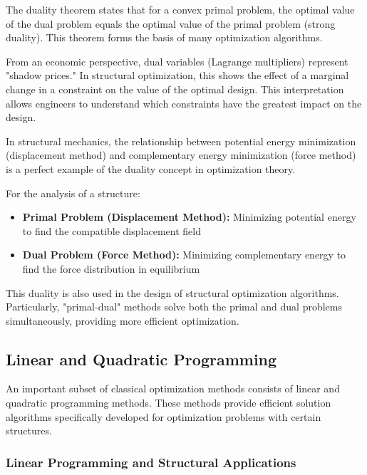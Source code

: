 The duality theorem states that for a convex primal problem, the optimal value of the dual problem equals the optimal value of the primal problem (strong duality). This theorem forms the basis of many optimization algorithms.

From an economic perspective, dual variables (Lagrange multipliers) represent "shadow prices." In structural optimization, this shows the effect of a marginal change in a constraint on the value of the optimal design. This interpretation allows engineers to understand which constraints have the greatest impact on the design.

\begin{tcolorbox}[title=Relationship Between Duality and Structural Analysis]
In structural mechanics, the relationship between potential energy minimization (displacement method) and complementary energy minimization (force method) is a perfect example of the duality concept in optimization theory.

For the analysis of a structure:
\begin{itemize}
    \item \textbf{Primal Problem (Displacement Method):} Minimizing potential energy to find the compatible displacement field
    \item \textbf{Dual Problem (Force Method):} Minimizing complementary energy to find the force distribution in equilibrium
\end{itemize}

This duality is also used in the design of structural optimization algorithms. Particularly, "primal-dual" methods solve both the primal and dual problems simultaneously, providing more efficient optimization.
\end{tcolorbox}

\subsection{Linear and Quadratic Programming}

An important subset of classical optimization methods consists of linear and quadratic programming methods. These methods provide efficient solution algorithms specifically developed for optimization problems with certain structures.

\subsubsection{Linear Programming and Structural Applications}

